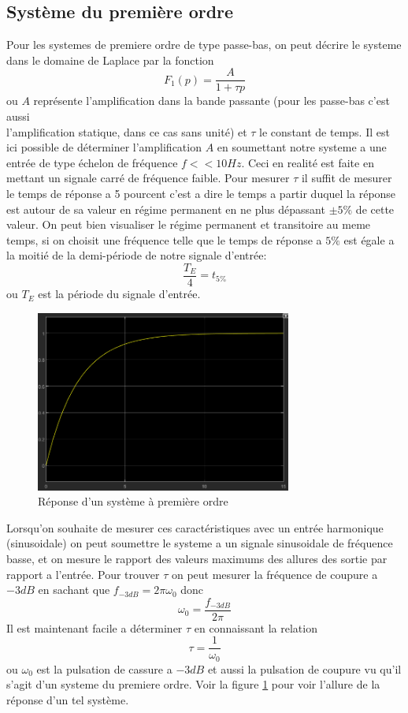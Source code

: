\documentclass[12pt, a4paper]{report}
\begin{document}
\subsection{Système du première ordre}

Pour les systemes de premiere ordre de type passe-bas, on peut décrire le systeme dans le domaine de Laplace
par la fonction 
\[
    F_{1}(p) = \frac{A}{1 + \tau p}     
\]
ou $A$ représente l'amplification dans la bande passante (pour les passe-bas c'est aussi\\ l'amplification statique, dans ce cas sans unité)
et $\tau$ le constant de temps. Il est ici possible de déterminer l'amplification $A$ en soumettant notre systeme
a une entrée de type échelon de fréquence $f << 10Hz$. Ceci en realité est faite en mettant un signale carré de fréquence faible. Pour mesurer $\tau$ il suffit de mesurer le temps de réponse a 5 pourcent
c'est a dire le temps a partir duquel la réponse est autour de sa valeur en régime permanent en ne plus dépassant $\pm 5\%$ de cette valeur. On peut bien visualiser
le régime permanent et transitoire au meme temps, si on choisit une fréquence telle que le temps de réponse a $5\%$ est égale a la moitié de la demi-période de notre
signale d'entrée:
\[
    \frac{T_{E}}{4} = t_{5\%}
\]
ou $T_{E}$ est la période du signale d'entrée.
\par

\begin{figure}[h]
    \centering
    \includegraphics[width=0.75\textwidth]{reponse1erordregenerale.png}
    \caption{Réponse d'un système à première ordre}
    \label{fig:reponse1erordre}
\end{figure}

Lorsqu'on souhaite de mesurer ces caractéristiques avec un entrée harmonique (sinusoidale) on peut soumettre le systeme
a un signale sinusoidale de fréquence basse, et on mesure le rapport des valeurs maximums des allures des sortie par rapport a 
l'entrée. Pour trouver $\tau$ on peut mesurer la fréquence de coupure a $-3dB$ en sachant que 
$f_{-3dB} = 2 \pi \omega_{0}$ donc
\[
    \omega_{0} = \frac{f_{-3dB}}{2 \pi}
\]
Il est maintenant facile a déterminer $\tau$ en connaissant la relation
\[
    \tau = \frac{1}{\omega_{0}}
\]
ou $\omega_{0}$ est la pulsation de cassure a $-3dB$ et aussi la pulsation de coupure vu qu'il s'agit 
d'un systeme du premiere ordre. Voir la figure \ref{fig:reponse1erordre} 
pour voir l'allure de la réponse
d'un tel système.
\end{document}
